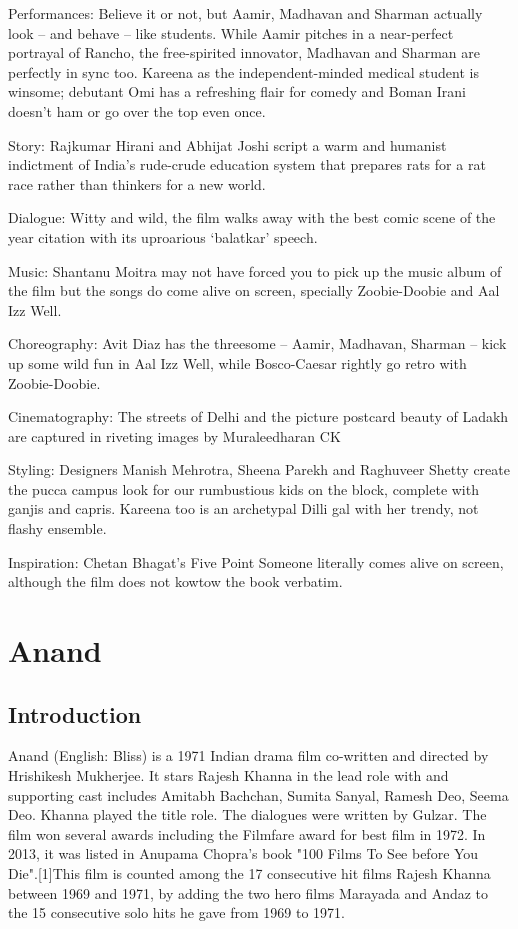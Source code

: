 \documentclass[11pt]{article}
\begin{document}
Performances: Believe it or not, but Aamir, Madhavan and Sharman actually look -- and behave -- like students. While Aamir pitches in a near-perfect portrayal of Rancho, the free-spirited innovator, Madhavan and Sharman are perfectly in sync too. Kareena as the independent-minded medical student is winsome; debutant Omi has a refreshing flair for comedy and Boman Irani doesn't ham or go over the top even once.

Story: Rajkumar Hirani and Abhijat Joshi script a warm and humanist indictment of India's rude-crude education system that prepares rats for a rat race rather than thinkers for a new world.

Dialogue: Witty and wild, the film walks away with the best comic scene of the year citation with its uproarious `balatkar' speech.

Music: Shantanu Moitra may not have forced you to pick up the music album of the film but the songs do come alive on screen, specially Zoobie-Doobie and Aal Izz Well.

Choreography: Avit Diaz has the threesome -- Aamir, Madhavan, Sharman -- kick up some wild fun in Aal Izz Well, while Bosco-Caesar rightly go retro with Zoobie-Doobie.

Cinematography: The streets of Delhi and the picture postcard beauty of Ladakh are captured in riveting images by Muraleedharan CK

Styling: Designers Manish Mehrotra, Sheena Parekh and Raghuveer Shetty create the pucca campus look for our rumbustious kids on the block, complete with ganjis and capris. Kareena too is an archetypal Dilli gal with her trendy, not flashy ensemble.

Inspiration: Chetan Bhagat's Five Point Someone literally comes alive on screen, although the film does not kowtow the book verbatim.

\section*{Anand}
\subsection*{Introduction}
Anand (English: Bliss) is a 1971 Indian drama film co-written and directed by Hrishikesh Mukherjee.
It stars Rajesh Khanna in the lead role with and supporting cast includes Amitabh Bachchan, Sumita Sanyal, 
Ramesh Deo, Seema Deo. Khanna played the title role. The dialogues were written by Gulzar. The film won 
several awards including the Filmfare award for best film in 1972. In 2013, it was listed in Anupama Chopra's
book "100 Films To See before You Die".[1]This film is counted among the 17 consecutive hit films Rajesh Khanna
between 1969 and 1971, by adding the two hero films Marayada and Andaz to the 15 consecutive solo hits he gave 
from 1969 to 1971.
\end{document}
